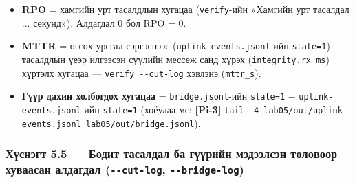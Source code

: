 \begin{longtable}[]{@{}lllllllll@{}}
\begin{minipage}[t]{0.08\columnwidth}
\strut
\end{minipage} & \begin{minipage}[t]{0.08\columnwidth}\raggedright
\strut
\end{minipage} & \begin{minipage}[t]{0.08\columnwidth}\raggedright
\strut
\end{minipage} & \begin{minipage}[t]{0.08\columnwidth}\raggedright
\strut
\end{minipage}\tabularnewline
\bottomrule
\end{longtable}\endgroup

\begin{itemize}
\tightlist
\item
  \textbf{RPO} = хамгийн урт тасалдлын хугацаа (\texttt{verify}-ийн «Хамгийн урт тасалдал ... секунд»). Алдагдал 0 бол RPO = 0.
\item
  \textbf{MTTR} = өгсөх урсгал сэргэснээс (\texttt{uplink-events.\allowbreak{}jsonl}-ийн \texttt{state=1}) тасалдлын үеэр илгээсэн сүүлийн мессеж санд хүрэх (\texttt{integrity.rx\_ms}) хүртэлх хугацаа --- \texttt{verify\ -\/\allowbreak{}-cut-log} хэвлэнэ (\texttt{mttr\_s}).
\item
  \textbf{Гүүр дахин холбогдох хугацаа} = \texttt{bridge.jsonl}-ийн \texttt{state=1} − \texttt{uplink-events.\allowbreak{}jsonl}-ийн \texttt{state=1} (хоёулаа мс; \textbf{{[}Pi-3{]}} \texttt{tail\ -4\ lab05/\allowbreak{}out/\allowbreak{}uplink-events.\allowbreak{}jsonl\ lab05/\allowbreak{}out/\allowbreak{}bridge.\allowbreak{}jsonl}).
\end{itemize}

\hypertarget{ux445ux4afux441ux43dux44dux433ux442-5.5-ux431ux43eux434ux438ux442-ux442ux430ux441ux430ux43bux434ux430ux43b-ux431ux430-ux433ux4afux4afux440ux438ux439ux43d-ux43cux44dux434ux44dux44dux43bux441ux44dux43d-ux442ux4e9ux43bux4e9ux432ux4e9ux4e9ux440-ux445ux443ux432ux430ux430ux441ux430ux43d-ux430ux43bux434ux430ux433ux434ux430ux43b---cut-log---bridge-log}{%
\subsubsection{\texorpdfstring{Хүснэгт 5.5 --- Бодит тасалдал ба гүүрийн мэдээлсэн төлөвөөр хуваасан алдагдал (\texttt{-\/-cut-log}, \texttt{-\/-bridge-log})}{Хүснэгт 5.5 --- Бодит тасалдал ба гүүрийн мэдээлсэн төлөвөөр хуваасан алдагдал (-\/-cut-log, -\/-bridge-log)}}\label{ux445ux4afux441ux43dux44dux433ux442-5.5-ux431ux43eux434ux438ux442-ux442ux430ux441ux430ux43bux434ux430ux43b-ux431ux430-ux433ux4afux4afux440ux438ux439ux43d-ux43cux44dux434ux44dux44dux43bux441ux44dux43d-ux442ux4e9ux43bux4e9ux432ux4e9ux4e9ux440-ux445ux443ux432ux430ux430ux441ux430ux43d-ux430ux43bux434ux430ux433ux434ux430ux43b---cut-log---bridge-log}}

